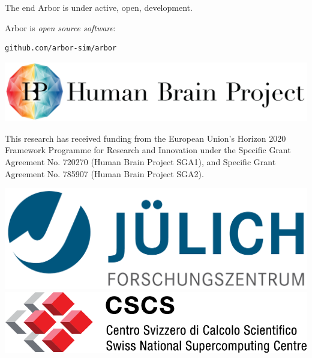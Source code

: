 \documentclass[aspectratio=43]{beamer}
\newcommand{\arbor}{{\ttfamily Arbor}\xspace}
\begin{document}
\begin{frame}[fragile]{The end}
    \arbor is under active, open, development.

    \vspace{10pt}

    \begin{center}
        \arbor is \emph{open source software}:\\
        \vspace{3pt}
        \begin{lstlisting}[style=talkpseudo]
                  github.com/arbor-sim/arbor
        \end{lstlisting}
    \end{center}
\end{frame}

\begin{frame}[fragile]{}
    \begin{center}
        \includegraphics[height=0.15\textwidth]{logos/HBP_logo.jpg}
        \\ \vfill

        This research has received funding from the European Union’s Horizon 2020 Framework Programme for Research
        and Innovation under the Specific Grant Agreement No.  720270 (Human Brain Project SGA1), and Specific Grant
        Agreement No. 785907 (Human Brain Project SGA2).
        \\ \vfill

        \includegraphics[height=0.1\textwidth]{logos/julich_logo.pdf}
        \hspace{1cm}
        \includegraphics[height=0.09\textwidth]{logos/cscs_logo.pdf}
    \end{center}

\end{frame}
\end{document}
